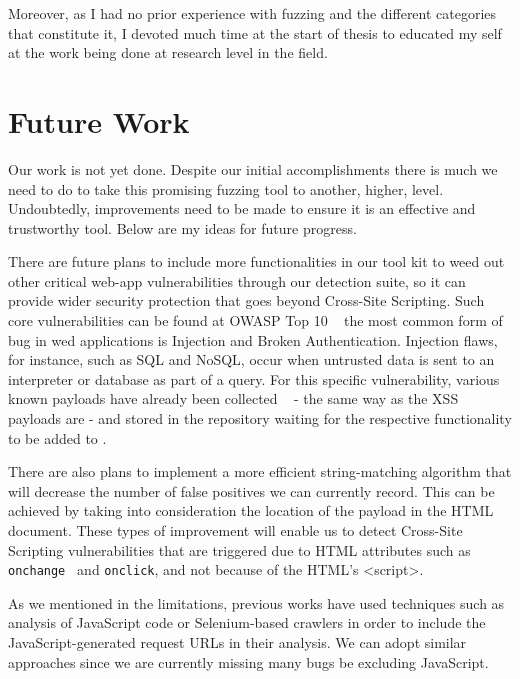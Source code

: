 Moreover, as I had no prior experience with fuzzing and the different categories that constitute it, I devoted much time at the start of thesis to educated my self at the work being done at research level in the field.


\section{Future Work}

Our work is not yet done. Despite our initial accomplishments there is much we need to do to take this promising fuzzing tool to another, higher, level. Undoubtedly, improvements need to be made to ensure it is an effective and trustworthy tool. Below are my ideas for future progress.

There are future plans to include more functionalities in our tool kit to weed out other critical web-app vulnerabilities through our detection suite, so it can provide wider security protection that goes beyond Cross-Site Scripting. Such core vulnerabilities can be found at OWASP Top 10 ~\cite{owasp2017} the most common form of bug in wed applications is Injection and Broken Authentication. Injection flaws, for instance, such as SQL and NoSQL, occur when untrusted data is sent to an interpreter or database as part of a query. For this specific vulnerability, various known payloads have already been collected ~\cite{seclist} - the same way as the XSS payloads are - and stored in the repository waiting for the respective functionality to be added to \pname{}.

There are also plans to implement a more efficient string-matching algorithm that will decrease the number of false positives we can currently record. This can be achieved by taking into consideration the location of the payload in the HTML document. These types of improvement will enable us to detect Cross-Site Scripting vulnerabilities that are triggered due to HTML attributes such as {\tt onchange } and {\tt onclick}, and not because of the HTML's <script>.

As we mentioned in the limitations, previous works have used techniques such as analysis of JavaScript code or Selenium-based crawlers in order to include the JavaScript-generated request URLs in their analysis. We can adopt similar approaches since we are currently missing many bugs be excluding JavaScript. %

